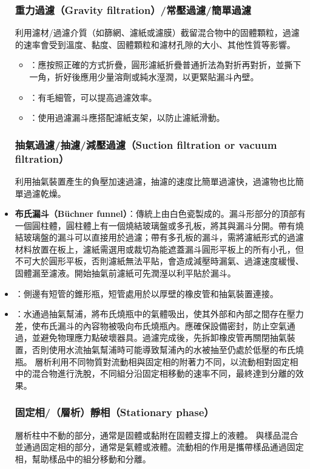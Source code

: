 \documentclass[a4paper,12pt]{article}
\begin{document}
\begin{itemize}
\subsubsection{重力過濾（Gravity filtration）/常壓過濾/簡單過濾}
利用濾材/過濾介質（如篩網、濾紙或濾膜）截留混合物中的固體顆粒，過濾的速率會受到溫度、黏度、固體顆粒和濾材孔隙的大小、其他性質等影響。
\begin{itemize}
\item {}：應按照正確的方式折疊，圓形濾紙折疊普通折法為對折再對折，並撕下一角，折好後應用少量溶劑或純水溼潤，以更緊貼漏斗內壁。
\item {}：有毛細管，可以提高過濾效率。
\item {}：使用過濾漏斗應搭配濾紙支架，以防止濾紙滑動。
\end{itemize}
\subsubsection{抽氣過濾/抽濾/減壓過濾（Suction filtration or vacuum filtration）}
利用抽氣裝置產生的負壓加速過濾，抽濾的速度比簡單過濾快，過濾物也比簡單過濾乾燥。
\bit
\item \textbf{布氏漏斗（Büchner funnel）}：傳統上由白色瓷製成的。漏斗形部分的頂部有一個圓柱體，圓柱體上有一個燒結玻璃盤或多孔板，將其與漏斗分開。帶有燒結玻璃盤的漏斗可以直接用於過濾；帶有多孔板的漏斗，需將濾紙形式的過濾材料放置在板上，濾紙需選用或裁切為能遮蓋漏斗圓形平板上的所有小孔，但不可大於圓形平板，否則濾紙無法平貼，會造成減壓時漏氣、過濾速度緩慢、固體漏至濾液。開始抽氣前濾紙可先潤溼以利平貼於漏斗。
\item {}：側邊有短管的錐形瓶，短管處用於以厚壁的橡皮管和抽氣裝置連接。
\item {}：水通過抽氣幫浦，將布氏燒瓶中的氣體吸出，使其外部和內部之間存在壓力差，使布氏漏斗的內容物被吸向布氏燒瓶內。應確保設備密封，防止空氣通過，並避免物理應力點破壞器具。過濾完成後，先拆卸橡皮管再關閉抽氣裝置，否則使用水流抽氣幫浦時可能導致幫浦內的水被抽至仍處於低壓的布氏燒瓶。
\eit
{}
層析利用不同物質對流動相與固定相的附著力不同，以流動相對固定相中的混合物進行洗脫，不同組分沿固定相移動的速率不同，最終達到分離的效果。
\subsubsection{固定相/（層析）靜相（Stationary phase）}
層析柱中不動的部分，通常是固體或黏附在固體支撐上的液體。
與樣品混合並通過固定相的部分，通常是氣體或液體。流動相的作用是攜帶樣品通過固定相，幫助樣品中的組分移動和分離。

\end{itemize}
\end{document}
